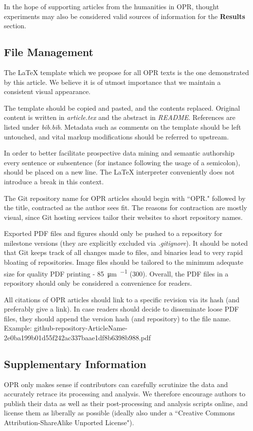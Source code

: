 In the hope of supporting articles from the humanities in OPR, thought experiments may also be considered valid sources of information for the \textbf{Results} section.
\subsection{File Management}
The LaTeX template which we propose for all OPR texts is the one demonstrated by this article.
We believe it is of utmost importance that we maintain a consistent visual appearance.

The template should be copied and pasted, and the contents replaced.
Original content is written in \textit{article.tex} and the abstract in \textit{README}. References are listed under \textit{bib.bib}.
Metadata such as comments on the template should be left untouched, and vital markup modifications should be referred to upstream.

In order to better facilitate prospective data mining and semantic authorship every sentence or subsentence (for instance following the usage of a semicolon), should be placed on a new line.
The LaTeX interpreter conveniently does not introduce a break in this context.

The Git repository name for OPR articles should begin with ``OPR." followed by the title, contracted as the author sees fit.
The reasons for contraction are mostly visual, since Git hosting services tailor their websites to short repository names.

Exported PDF files and figures should only be pushed to a repository for milestone versions
(they are explicitly excluded via \textit{.gitignore}).
It should be noted that Git keeps track of all changes made to files, and binaries lead to very rapid bloating of repositories.
Image files should be tailored to the minimum adequate size for quality PDF printing - \SI{85}{\micro\meter\per{}} (\SI{300}{}).
Overall, the PDF files in a repository should only be considered a convenience for readers.

All citations of OPR articles should link to a specific revision via its hash (and preferably give a link).
In case readers should decide to disseminate loose PDF files, they should append the version hash (and repository) to the file name.
Example: \textcolor{Aubergine}{github-repository-ArticleName-2e0ba199b01d55f242ac337baae1df8b6398b988.pdf}
\subsection{Supplementary Information}
OPR only makes sense if contributors can carefully scrutinize the data and accurately retrace its processing and analysis. 
We therefore encourage authors to publish their data as well as their post-processing and analysis scripts online,
and license them as liberally as possible (ideally also under a ``Creative Commons Attribution-ShareAlike Unported License").

